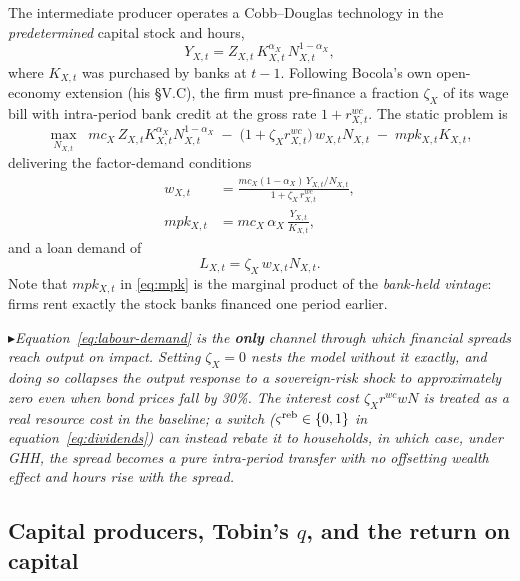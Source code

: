 \documentclass[11pt]{article}
\numberwithin{equation}{section}
\theoremstyle{definition}
\theoremstyle{plain}
\theoremstyle{remark}
\newcommand{\impl}[1]{\par\smallskip\noindent\textcolor{notec}{$\blacktriangleright$}\;\emph{#1}\par\smallskip}
\begin{document}
The intermediate producer operates a Cobb--Douglas technology in the
\emph{predetermined} capital stock and hours,
\begin{equation}
Y_{X,t}=Z_{X,t}\,K_{X,t}^{\alpha_X}\,N_{X,t}^{1-\alpha_X},
\label{eq:production}
\end{equation}
where $K_{X,t}$ was purchased by banks at $t-1$. Following Bocola's own open-economy
extension (his \S V.C), the firm must pre-finance a fraction $\zeta_X$ of its wage
bill with intra-period bank credit at the gross rate $1+r^{wc}_{X,t}$. The static
problem is
\begin{equation}
\max_{N_{X,t}}\;\;
mc_X\,Z_{X,t}K_{X,t}^{\alpha_X}N_{X,t}^{1-\alpha_X}
\;-\;\bigl(1+\zeta_X r^{wc}_{X,t}\bigr)\,w_{X,t}N_{X,t}
\;-\;mpk_{X,t}K_{X,t},
\label{eq:firm-problem}
\end{equation}
delivering the factor-demand conditions
\begin{align}
w_{X,t}&=\frac{mc_X(1-\alpha_X)\,Y_{X,t}/N_{X,t}}{1+\zeta_X\,r^{wc}_{X,t}},
\label{eq:labour-demand}\\[3pt]
mpk_{X,t}&=mc_X\,\alpha_X\,\frac{Y_{X,t}}{K_{X,t}},
\label{eq:mpk}
\end{align}
and a loan demand of
\begin{equation}
L_{X,t}=\zeta_X\,w_{X,t}N_{X,t}.
\label{eq:loan-demand}
\end{equation}
Note that $mpk_{X,t}$ in \eqref{eq:mpk} is the marginal product of the
\emph{bank-held vintage}: firms rent exactly the stock banks financed one period
earlier.

\impl{Equation~\eqref{eq:labour-demand} is the \textbf{only} channel through which
financial spreads reach output on impact. Setting $\zeta_X=0$ nests the model
without it exactly, and doing so collapses the output response to a sovereign-risk
shock to approximately zero even when bond prices fall by 30\%. The interest cost
$\zeta_X r^{wc}wN$ is treated as a real resource cost in the baseline; a switch
($\varsigma^{\rm reb}\in\{0,1\}$ in equation~\eqref{eq:dividends}) can instead rebate
it to households, in which case, under GHH, the spread becomes a pure intra-period
transfer with no offsetting wealth effect and hours \emph{rise} with the spread.}

\subsection{\texorpdfstring{Capital producers, Tobin's $q$, and the return on capital}
                          {Capital producers, Tobin's q, and the return on capital}}
\end{document}
